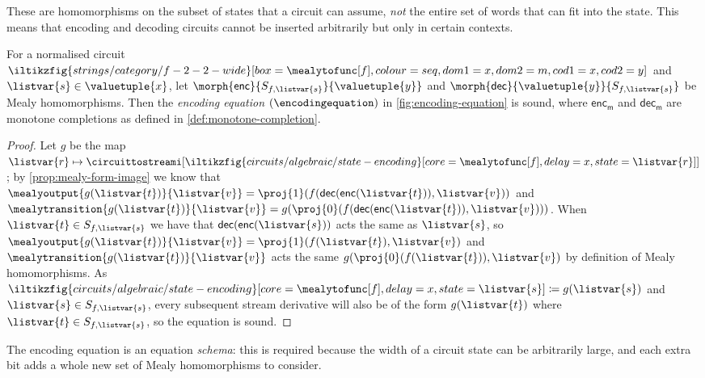 These are homomorphisms on the subset of states that a circuit
can assume, \emph{not} the entire set of words that can fit into the state.
This means that encoding and decoding circuits cannot be inserted arbitrarily
but only in certain contexts.

\begin{proposition}\label{prop:encoding-equation}
    For a normalised circuit \(
    \iltikzfig{strings/category/f-2-2-wide}[box=\mealytofunc[f],colour=seq,dom1=x,dom2=m,cod1=x,cod2=y]
    \) and \(\listvar{s} \in \valuetuple{x}\), let
    \(\morph{\mathsf{enc}}{S_{f,\listvar{s}}}{\valuetuple{y}}\) and
    \(\morph{\mathsf{dec}}{\valuetuple{y}}{S_{f, \listvar{s}}}\) be Mealy
    homomorphisms.
    Then the \emph{encoding equation} \((\encodingequation)\) in
    \cref{fig:encoding-equation} is sound, where
    \(\mathsf{enc}_\mathsf{m}\) and \(\mathsf{dec}_\mathsf{m}\) are monotone
    completions as defined in \cref{def:monotone-completion}.
\end{proposition}
\begin{proof}
    Let \(g\) be the map \(\listvar{r} \mapsto
    \circuittostreami[\iltikzfig{circuits/algebraic/state-encoding}[core=\mealytofunc[f],delay=x,state=\listvar{r}]]
    \); by \cref{prop:mealy-form-image} we know that \(
    \mealyoutput{g(\listvar{t})}{\listvar{v}}
    =
    \proj{1}(f(\mathsf{dec}(\mathsf{enc}(\listvar{t})), \listvar{v}))
    \) and \(
    \mealytransition{g(\listvar{t})}{\listvar{v}}
    =
    g(\proj{0}(f(\mathsf{dec}(\mathsf{enc}(\listvar{t})), \listvar{v})))
    \).
    When \(\listvar{t} \in S_{f, \listvar{s}}\) we have that \(
    \mathsf{dec}(\mathsf{enc}(\listvar{s}))\) acts the same as
    \(\listvar{s}\),
    so
    \(
    \mealyoutput{g(\listvar{t})}{\listvar{v}}
    =
    \proj{1}(f(\listvar{t}), \listvar{v})
    \) and \(
    \mealytransition{g(\listvar{t})}{\listvar{v}}
    \) acts the same \(
    g(\proj{0}(f(\listvar{t})), \listvar{v})
    \) by definition of Mealy homomorphisms.
    As \(
    \iltikzfig{circuits/algebraic/state-encoding}[core=\mealytofunc[f],delay=x,state=\listvar{s}]
    \coloneqq
    g(\listvar{s})
    \) and \(\listvar{s} \in S_{f,\listvar{s}}\),
    every subsequent stream derivative will also be of the form
    \(g(\listvar{t})\) where \(\listvar{t} \in S_{f,\listvar{s}}\), so the
    equation is sound.
\end{proof}

\begin{remark}
    The encoding equation is an equation \emph{schema}: this is required because
    the width of a circuit state can be arbitrarily large, and each extra bit
    adds a whole new set of Mealy homomorphisms to consider.
\end{remark}

